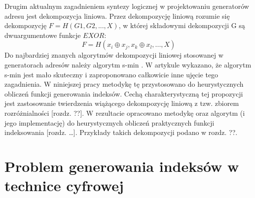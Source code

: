 Drugim aktualnym zagadnieniem syntezy logicznej w projektowaniu generatorów adresu jest dekompozycja liniowa.
Przez dekompozycję liniową rozumie się dekompozycję $F = H(G1, G2, ...,  X)$,
w której składowymi dekompozycji G są dwuargumentowe funkcje $EXOR$:
\begin{equation}
F = H (x_i \oplus x_j, x_k \oplus x_l, ..., X)
\end{equation}
Do najbardziej znanych algorytmów dekompozycji liniowej stosowanej w generatorach adresów należy algorytm s-min \cite{sasao-recent, sasao-s-min}.
W artykule \cite{redukcja-kompresja} wykazano, że algorytm s-min jest mało skuteczny i zaproponowano całkowicie inne ujęcie tego zagadnienia.
W niniejszej pracy metodykę tę przystosowano do heurystycznych obliczeń funkcji generowania indeksów.
Cechą charakterystyczną tej propozycji jest zastosowanie twierdzenia wiążącego dekompozycję liniową z tzw. zbiorem rozróżnialności [rozdz. ??].
W rezultacie opracowano metodykę oraz algorytm (i jego implementację) do heurystycznych obliczeń praktycznych funkcji indeksowania [rozdz. …].
Przykłady takich dekompozycji podano w rozdz. ??.

\section{Problem generowania indeksów w technice cyfrowej}

